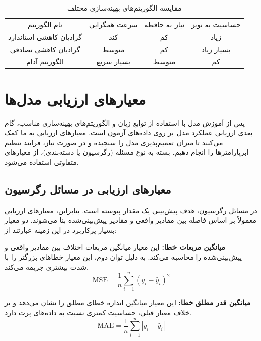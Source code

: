 \begin{table}[H]
	\centering
	\caption{مقایسه الگوریتم‌های بهینه‌سازی مختلف}
	\label{tb2}
	\renewcommand{\arraystretch}{1.5}
	\setlength{\tabcolsep}{10pt}
	\setlength{\arrayrulewidth}{0.8pt}
	
	\begin{tabular}{|c!{\color{blue}\vrule width 2pt}c|c|c|}
		\hline
		نام الگوریتم & سرعت همگرایی & نیاز به حافظه & حساسیت به نویز \\
		\Xhline{3pt}
		
		گرادیان کاهشی استاندارد & کند & کم & زیاد \\
		\hline
		
		گرادیان کاهشی تصادفی & متوسط & کم & بسیار زیاد \\
		\hline
		
		الگوریتم آدام & بسیار سریع & متوسط & کم \\
		\hline
	\end{tabular}
\end{table}

\section{معیارهای ارزیابی مدل‌ها}\label{sec:3-6}
پس از آموزش مدل با استفاده از توابع زیان و الگوریتم‌های بهینه‌سازی مناسب، گام بعدی ارزیابی عملکرد مدل بر روی داده‌های آزمون است. معیارهای ارزیابی به ما کمک می‌کنند تا میزان تعمیم‌پذیری مدل را سنجیده و در صورت نیاز، فرایند تنظیم ابرپارامترها را انجام دهیم. بسته به نوع مسئله (رگرسیون یا دسته‌بندی)، از معیارهای متفاوتی استفاده می‌شود.

\subsection{معیارهای ارزیابی در مسائل رگرسیون}\label{subsec:3-6-1}
در مسائل رگرسیون، هدف پیش‌بینی یک مقدار پیوسته است. بنابراین، معیارهای ارزیابی معمولاً بر اساس فاصله بین مقادیر واقعی و مقادیر پیش‌بینی‌شده بنا می‌شوند. دو معیار بسیار پرکاربرد در این زمینه عبارتند از:

\textbf{میانگین مربعات خطا:} این معیار میانگین مربعات اختلاف بین مقادیر واقعی و پیش‌بینی‌شده را محاسبه می‌کند. به دلیل توان دوم، این معیار خطاهای بزرگتر را با شدت بیشتری جریمه می‌کند.
\begin{equation} \label{eq15}
	\mathrm{MSE} = \frac{1}{n} \sum_{i=1}^{n} (y_i - \hat{y}_i)^2
\end{equation}

\textbf{میانگین قدر مطلق خطا:} این معیار میانگین اندازه خطای مطلق را نشان می‌دهد و بر خلاف معیار قبلی، حساسیت کمتری نسبت به داده‌های پرت دارد.
\begin{equation} \label{eq16}
	\mathrm{MAE} = \frac{1}{n} \sum_{i=1}^{n} |y_i - \hat{y}_i|
\end{equation}

